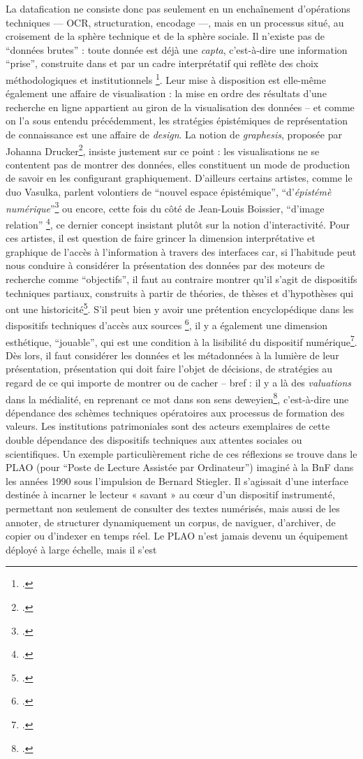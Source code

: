 La datafication ne consiste donc pas seulement en un enchaînement d’opérations techniques — OCR, structuration, encodage —, mais en un processus situé, au croisement de la sphère technique et de la sphère sociale. Il n’existe pas de \enquote{données brutes} : toute donnée est déjà une \emph{capta}, c’est-à-dire une information \enquote{prise}, construite dans et par un cadre interprétatif qui reflète des choix méthodologiques et institutionnels \footcite[][]{drucker}. Leur mise à disposition est elle-même également une affaire de visualisation : la mise en ordre des résultats d'une recherche en ligne appartient au giron de la visualisation des données -- et comme on l'a sous entendu précédemment, les stratégies épistémiques de représentation de connaissance est une affaire de \emph{design}. La notion de \emph{graphesis}, proposée par Johanna Drucker\footcite[][]{drucker}, insiste justement sur ce point : les visualisations ne se contentent pas de montrer des données, elles constituent un mode de production de savoir en les configurant graphiquement. D'ailleurs certains artistes, comme le duo Vasulka, parlent volontiers de \enquote{nouvel espace épistémique}, \enquote{d'\emph{épistémè numérique}}\footcite[][]{dallet} ou encore, cette fois du côté de Jean-Louis Boissier, \enquote{d'image relation} \footcite[][]{boissier}, ce dernier concept insistant plutôt sur la notion d'interactivité. Pour ces artistes, il est question de faire grincer la dimension interprétative et graphique de l'accès à l'information à travers des interfaces car, si l'habitude peut nous conduire à considérer la présentation des données par des moteurs de recherche comme \enquote{objectifs}, il faut au contraire montrer qu'il s'agit de dispositifs techniques partiaux, construits à partir de théories, de thèses et d'hypothèses qui ont une historicité\footcite[][]{daston}. S'il peut bien y avoir une prétention encyclopédique dans les dispositifs techniques d'accès aux sources \footcite[][]{wagneur}, il y a également une dimension esthétique, \enquote{jouable}, qui est une condition à la lisibilité du dispositif numérique\footcite[][]{boissier}. Dès lors, il faut considérer les données et les métadonnées à la lumière de leur présentation, présentation qui doit faire l'objet de décisions, de stratégies au regard de ce qui importe de montrer ou de cacher -- bref : il y a là des \emph{valuations} dans la médialité, en reprenant ce mot dans son sens deweyien\footcite[][]{dewey}, c'est-à-dire une dépendance des schèmes techniques opératoires aux processus de formation des valeurs. Les institutions patrimoniales sont des acteurs exemplaires de cette double dépendance des dispositifs techniques aux attentes sociales ou scientifiques. Un exemple particulièrement riche de ces réflexions se trouve dans le PLAO (pour \enquote{Poste de Lecture Assistée par Ordinateur}) imaginé à la BnF dans les années 1990 sous l’impulsion de Bernard Stiegler. Il s’agissait d’une interface destinée à incarner le lecteur « savant » au cœur d’un dispositif instrumenté, permettant non seulement de consulter des textes numérisés, mais aussi de les annoter, de structurer dynamiquement un corpus, de naviguer, d’archiver, de copier ou d’indexer en temps réel. Le PLAO n’est jamais devenu un équipement déployé à large échelle, mais il s’est 